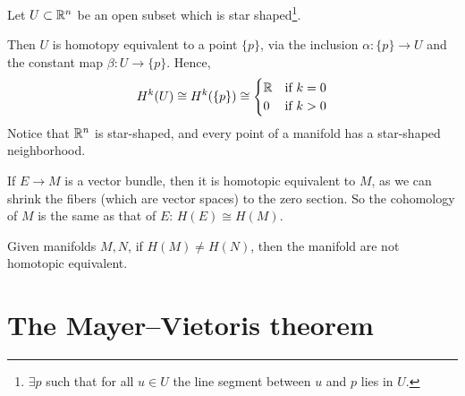 \begin{remark}
    Let $U \subset \mathbb{R}^n$ be an open subset which is star shaped\footnote{$\exists p$ such that  for all $u \in U$ the line segment between $u$ and $p$ lies in $U$.}.

    Then $U$ is homotopy equivalent to a point $\{p\}$,
    via the inclusion  $ \alpha: \{p\}  \to U $  and the constant map
    $ \beta: U \to \{p\}$. 
    Hence, \[
        H^{k}(U) \cong H^{k}(\{p\}) \cong
        \begin{cases}
            \mathbb{R} &\text{if $k = 0$}\\
            0 &\text{if $k > 0$}
        \end{cases}
    \]
    Notice that $\mathbb{R}^n$ is star-shaped, and every point of a manifold has a star-shaped neighborhood.
\end{remark}

\begin{eg}
    If $E \to  M$ is a vector bundle, then it is homotopic equivalent to $M$,
    as we can shrink the fibers (which are vector spaces) to the zero section. So the cohomology of $M$ is the same as that of $E$: $H(E) \cong H(M)$.   
\end{eg}

\begin{remark}
    Given manifolds $M, N$, if $H(M) \neq H(N)$, then the manifold are not homotopic equivalent.
\end{remark}

\section{The Mayer--Vietoris theorem}


